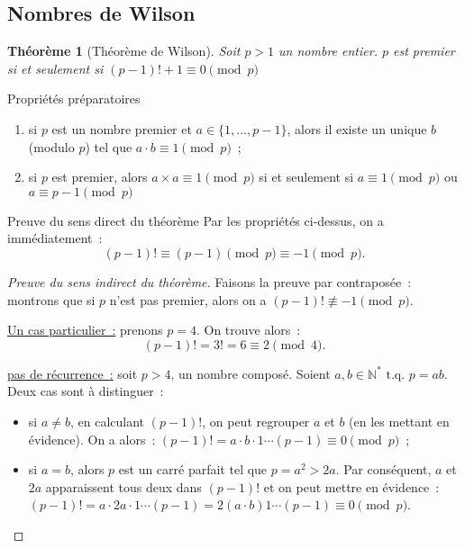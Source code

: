 \documentclass[10pt, mathserif]{beamer}
\newcommand{\tq}{\text{ t.q. }}
\newcommand{\N}{\mathbb N}
\newtheorem{thm}{Théorème}[section]
\theoremstyle{definition}
\theoremstyle{remark}
\begin{document}
	\subsection{Nombres de Wilson}
	\begin{frame}
		\begin{thm}[Théorème de Wilson]
			Soit $p > 1$ un nombre entier. $p$ est premier si et seulement si $(p-1)! + 1 \equiv 0 \pmod p$
		\end{thm}

		\begin{block}{Propriétés préparatoires}
			\begin{enumerate}
				\item si $p$ est un nombre premier et $a \in \{1, \dotsc, p-1\}$, alors il existe un unique $b$ (modulo $p$) tel que $a \cdot b \equiv 1 \pmod p$~;
				\item si $p$ est premier, alors $a \times a \equiv 1 \pmod p$ si et seulement si $a \equiv 1 \pmod p$ ou $a \equiv p-1 \pmod p$
			\end{enumerate}
		\end{block}

		\begin{block}{Preuve du sens direct du théorème}
			Par les propriétés ci-dessus, on a immédiatement~:
			\[(p-1)! \equiv (p-1) \pmod p \equiv -1 \pmod p.\]
		\end{block}
	\end{frame}

	\begin{frame}
		\begin{proof}[Preuve du sens indirect du théorème]
			Faisons la preuve par contraposée~: montrons que si $p$ n'est pas premier, alors on a $(p-1)! \not \equiv -1 \pmod p$.

			\underline{Un cas particulier~:} prenons $p = 4$. On trouve alors~:
			\[(p-1)! = 3! = 6 \equiv 2 \pmod 4.\]

			\underline{pas de récurrence~:} soit $p > 4$, un nombre composé. Soient $a, b \in \N^* \tq p = ab$. Deux cas sont à distinguer~:
			\begin{itemize}
				\item si $a \neq b$, en calculant $(p-1)!$, on peut regrouper $a$ et $b$ (en les mettant en évidence). On a alors~:
				$(p-1)! = a \cdot b \cdot 1 \dotsm (p-1) \equiv 0 \pmod p$~;
				\item si $a = b$, alors $p$ est un carré parfait tel que $p = a^2 > 2a$. Par conséquent, $a$ et $2a$ apparaissent tous deux dans $(p-1)!$
				et on peut mettre en évidence~: $(p-1)! = a \cdot 2a \cdot 1 \dotsm (p-1) = 2(a \cdot b)1 \dotsm (p-1) \equiv 0 \pmod p$.
			\end{itemize}
		\end{proof}
	\end{frame}
	
\end{document}
